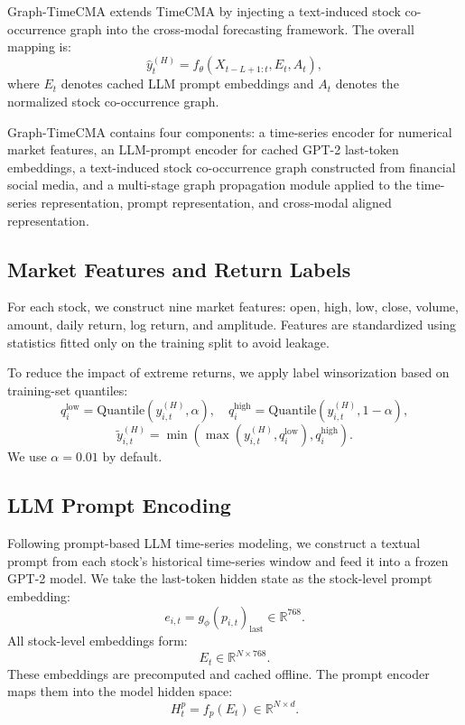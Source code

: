 \documentclass[11pt]{article}
\begin{document}
Graph-TimeCMA extends TimeCMA by injecting a text-induced stock co-occurrence graph into the cross-modal forecasting framework. The overall mapping is:
\begin{equation}
\hat{y}^{(H)}_t = f_\theta(X_{t-L+1:t}, E_t, A_t),
\end{equation}
where $E_t$ denotes cached LLM prompt embeddings and $A_t$ denotes the normalized stock co-occurrence graph.

Graph-TimeCMA contains four components: a time-series encoder for numerical market features, an LLM-prompt encoder for cached GPT-2 last-token embeddings, a text-induced stock co-occurrence graph constructed from financial social media, and a multi-stage graph propagation module applied to the time-series representation, prompt representation, and cross-modal aligned representation.

\subsection{Market Features and Return Labels}

For each stock, we construct nine market features: open, high, low, close, volume, amount, daily return, log return, and amplitude. Features are standardized using statistics fitted only on the training split to avoid leakage.

To reduce the impact of extreme returns, we apply label winsorization based on training-set quantiles:
\begin{equation}
q_i^{\text{low}} = \text{Quantile}(y^{(H)}_{i,t}, \alpha), \quad
q_i^{\text{high}} = \text{Quantile}(y^{(H)}_{i,t}, 1-\alpha),
\end{equation}
\begin{equation}
\tilde{y}^{(H)}_{i,t} = \min \left( \max \left(y^{(H)}_{i,t}, q_i^{\text{low}}\right), q_i^{\text{high}} \right).
\end{equation}
We use $\alpha = 0.01$ by default.

\subsection{LLM Prompt Encoding}

Following prompt-based LLM time-series modeling, we construct a textual prompt from each stock's historical time-series window and feed it into a frozen GPT-2 model. We take the last-token hidden state as the stock-level prompt embedding:
\begin{equation}
e_{i,t} = g_\phi(p_{i,t})_{\text{last}} \in \mathbb{R}^{768}.
\end{equation}
All stock-level embeddings form:
\begin{equation}
E_t \in \mathbb{R}^{N \times 768}.
\end{equation}
These embeddings are precomputed and cached offline. The prompt encoder maps them into the model hidden space:
\begin{equation}
H_t^{p} = f_p(E_t) \in \mathbb{R}^{N \times d}.
\end{equation}
\end{document}
